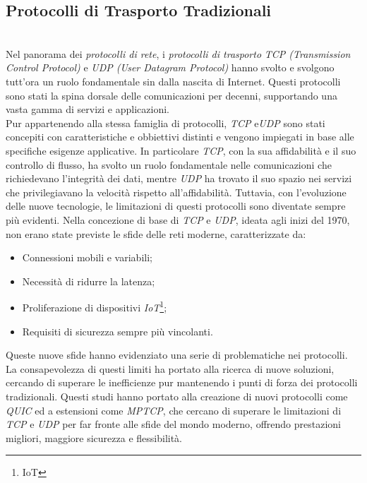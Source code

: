 \subsection{Protocolli di Trasporto Tradizionali}
~\\
\indent Nel panorama dei \emph{protocolli di rete}, i \emph{protocolli di trasporto} \emph{TCP (Transmission Control Protocol)}  e \emph{UDP (User Datagram Protocol)} hanno svolto e svolgono tutt'ora un ruolo fondamentale sin dalla nascita di Internet.
Questi protocolli sono stati la spina dorsale delle comunicazioni per decenni, supportando una vasta gamma di servizi e applicazioni.\\
Pur appartenendo alla stessa famiglia di protocolli, \emph{TCP} e\emph{UDP} sono stati concepiti con caratteristiche e obbiettivi distinti e vengono impiegati in base alle specifiche esigenze applicative.
In particolare \emph{TCP}, con la sua affidabilità e il suo controllo di flusso, ha svolto un ruolo fondamentale nelle comunicazioni che richiedevano l'integrità dei dati, mentre \emph{UDP} ha trovato il suo spazio nei servizi che privilegiavano la velocità rispetto all'affidabilità. 
Tuttavia, con l'evoluzione delle nuove tecnologie, le limitazioni di questi protocolli sono diventate sempre più evidenti. Nella concezione di base di \emph{TCP} e \emph{UDP}, ideata agli inizi del 1970, non erano state previste le sfide delle reti moderne, 
caratterizzate da:  
\begin{itemize}
    \item Connessioni mobili e variabili;
    
    \item Necessità di ridurre la latenza;
    
    \item Proliferazione di dispositivi \emph{IoT}\footnote{\gls{IoT}};
     
    \item Requisiti di sicurezza sempre più vincolanti.
\end{itemize}

\noindent Queste nuove sfide hanno evidenziato una serie di problematiche nei protocolli. La consapevolezza di questi limiti ha portato alla ricerca di nuove soluzioni, cercando di superare le inefficienze pur mantenendo i punti di forza dei protocolli tradizionali.
Questi studi hanno portato alla creazione di nuovi protocolli come \emph{QUIC} ed a estensioni come \emph{MPTCP}, che cercano di superare le limitazioni di \emph{TCP} e \emph{UDP} per far fronte alle sfide del mondo moderno, offrendo prestazioni migliori, maggiore sicurezza e flessibilità.

